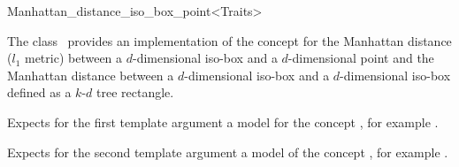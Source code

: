 

\begin{ccRefClass}{Manhattan_distance_iso_box_point<Traits>}  %


\ccDefinition
  
The class \ccRefName\ provides an implementation of
the  concept
for the Manhattan distance ($l_1$ metric)
between a $d$-dimensional iso-box and a $d$-dimensional point 
and the Manhattan distance between a $d$-dimensional iso-box
and a $d$-dimensional iso-box defined as a $k$-$d$ tree rectangle.


\ccParameters
Expects for the first template argument
a model for the concept , for example .

Expects for the second template argument a model
of the concept ,
for example .


\ccIsModel


\ccTypes


\ccCreation
{}  %


\ccOperations



\end{ccRefClass}
